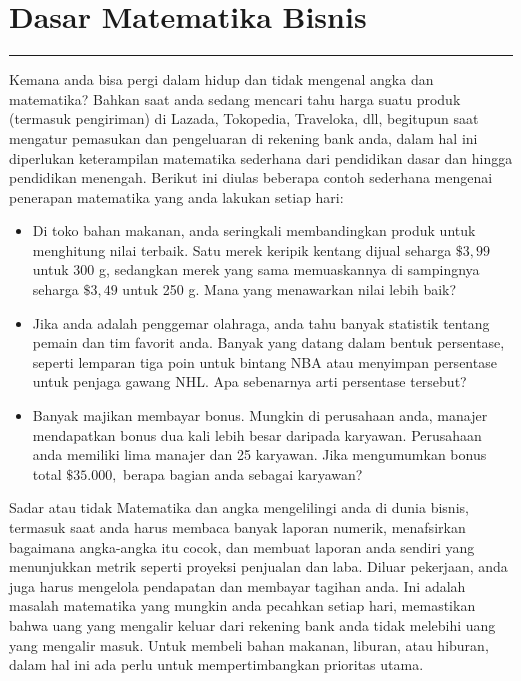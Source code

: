 \documentclass[
]{book}
\providecommand{\tightlist}{%
  \setlength{\itemsep}{0pt}\setlength{\parskip}{0pt}}
\begin{document}
\hypertarget{Dasar-Matematika-Bisnis}{%
\chapter{Dasar Matematika Bisnis}\label{Dasar-Matematika-Bisnis}}

\begin{center}\rule{0.5\linewidth}{0.5pt}\end{center}

Kemana anda bisa pergi dalam hidup dan tidak mengenal angka dan matematika? Bahkan saat anda sedang mencari tahu harga suatu produk (termasuk pengiriman) di Lazada, Tokopedia, Traveloka, dll, begitupun saat mengatur pemasukan dan pengeluaran di rekening bank anda, dalam hal ini diperlukan keterampilan matematika sederhana dari pendidikan dasar dan hingga pendidikan menengah. Berikut ini diulas beberapa contoh sederhana mengenai penerapan matematika yang anda lakukan setiap hari:

\begin{itemize}
\tightlist
\item
  Di toko bahan makanan, anda seringkali membandingkan produk untuk menghitung nilai terbaik. Satu merek keripik kentang dijual seharga \(\$ 3,99\) untuk 300 g, sedangkan merek yang sama memuaskannya di sampingnya seharga \(\$ 3,49\) untuk 250 g. Mana yang menawarkan nilai lebih baik?
\item
  Jika anda adalah penggemar olahraga, anda tahu banyak statistik tentang pemain dan tim favorit anda. Banyak yang datang dalam bentuk persentase, seperti lemparan tiga poin untuk bintang NBA atau menyimpan persentase untuk penjaga gawang NHL. Apa sebenarnya arti persentase tersebut?
\item
  Banyak majikan membayar bonus. Mungkin di perusahaan anda, manajer mendapatkan bonus dua kali lebih besar daripada karyawan. Perusahaan anda memiliki lima manajer dan 25 karyawan. Jika mengumumkan bonus total \(\$ 35.000,\) berapa bagian anda sebagai karyawan?
\end{itemize}

Sadar atau tidak Matematika dan angka mengelilingi anda di dunia bisnis, termasuk saat anda harus membaca banyak laporan numerik, menafsirkan bagaimana angka-angka itu cocok, dan membuat laporan anda sendiri yang menunjukkan metrik seperti proyeksi penjualan dan laba. Diluar pekerjaan, anda juga harus mengelola pendapatan dan membayar tagihan anda. Ini adalah masalah matematika yang mungkin anda pecahkan setiap hari, memastikan bahwa uang yang mengalir keluar dari rekening bank anda tidak melebihi uang yang mengalir masuk. Untuk membeli bahan makanan, liburan, atau hiburan, dalam hal ini ada perlu untuk mempertimbangkan prioritas utama.
\end{document}
